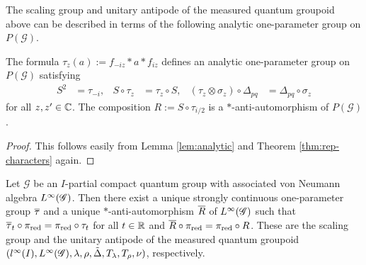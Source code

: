 The scaling group and unitary antipode of the measured quantum
groupoid above can be described in terms of the following analytic one-parameter group on $P(\mathscr{G})$.
\begin{Lem} \label{lem:scaling}
 The formula $\tau_{z}(a):= f_{-iz} \ast a \ast f_{iz}$ defines an analytic one-parameter group on $P(\mathscr{G})$ satisfying
\begin{align*} 
 S^{2} &= \tau_{-i}, & S \circ
    \tau_{z} &= \tau_{z} \circ S, & (\tau_{z} \otimes \sigma_{z})
    \circ \Delta_{pq} &= \Delta_{pq} \circ \sigma_{z}
  \end{align*}
for all $z,z'\in \mathbb{C}$. The composition $R:=S\circ
\tau_{i/2}$ is a $*$-anti-automorphism of $P(\mathscr{G})$.
\end{Lem}
\begin{proof}
  This follows easily from Lemma \ref{lem:analytic} and Theorem \ref{thm:rep-characters} again.
\end{proof}
\begin{Prop}
  Let $\mathscr{G}$ be an $I$-partial compact quantum group with  associated von Neumann algebra $L^{\infty}(\mathscr{G})$. Then there exist a unique strongly continuous one-parameter group $\overline{\tau}$ and
 a unique $*$-anti-automorphism $\overline{R}$ of $L^{\infty}(\mathscr{G})$ such that  $\overline{\tau}_{t} \circ \pi_{\operatorname{\mathrm{red}}} = \pi_{\operatorname{\mathrm{red}}} \circ
\tau_{t}$ for  all $t\in \mathbb{R}$ and
$\overline{R} \circ \pi_{\operatorname{\mathrm{red}}} = \pi_{\operatorname{\mathrm{red}}} \circ R$.  These are the scaling group and the unitary antipode of the measured
 quantum groupoid $(l^{\infty}(I),L^{\infty}(\mathscr{G}), \lambda,\rho,\tilde\Delta,
 T_{\lambda},T_{\rho},\nu)$, respectively.
\end{Prop}
